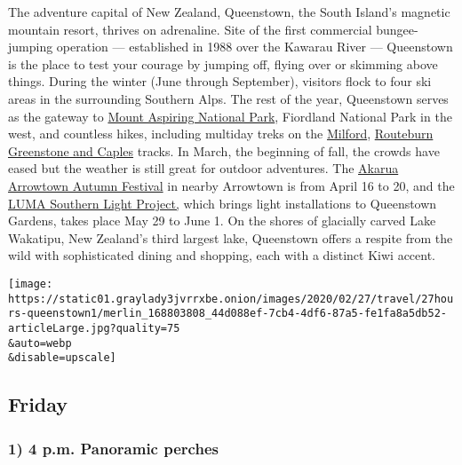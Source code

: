 The adventure capital of New Zealand, Queenstown, the South Island's
magnetic mountain resort, thrives on adrenaline. Site of the first
commercial bungee-jumping operation --- established in 1988 over the
Kawarau River --- Queenstown is the place to test your courage by
jumping off, flying over or skimming above things. During the winter
(June through September), visitors flock to four ski areas in the
surrounding Southern Alps. The rest of the year, Queenstown serves as
the gateway to
\href{https://www.doc.govt.nz/parks-and-recreation/places-to-go/otago/places/mount-aspiring-national-park/}{Mount
Aspiring National Park}, Fiordland National Park in the west, and
countless hikes, including multiday treks on the
\href{https://www.doc.govt.nz/parks-and-recreation/places-to-go/fiordland/places/fiordland-national-park/things-to-do/tracks/milford-track/}{Milford},
\href{https://www.doc.govt.nz/parks-and-recreation/places-to-go/fiordland/places/fiordland-national-park/things-to-do/tracks/routeburn-track/}{Routeburn}
\href{https://www.doc.govt.nz/parks-and-recreation/places-to-go/otago/places/greenstone-and-caples-conservation-areas/things-to-do/greenstone-and-caples-tracks/}{Greenstone
and Caples} tracks. In March, the beginning of fall, the crowds have
eased but the weather is still great for outdoor adventures. The
\href{https://arrowtownautumnfestival.co.nz/}{Akarua Arrowtown Autumn
Festival} in nearby Arrowtown is from April 16 to 20, and the
\href{http://luma.nz/}{LUMA Southern Light Project,} which brings light
installations to Queenstown Gardens, takes place May 29 to June 1. On
the shores of glacially carved Lake Wakatipu, New Zealand's third
largest lake, Queenstown offers a respite from the wild with
sophisticated dining and shopping, each with a distinct Kiwi accent.

\texttt{[image: https://static01.graylady3jvrrxbe.onion/images/2020/02/27/travel/27hours-queenstown1/merlin\_168803808\_44d088ef-7cb4-4df6-87a5-fe1fa8a5db52-articleLarge.jpg?quality=75\\\&auto=webp\\\&disable=upscale]}

\hypertarget{friday}{%
\subsection{Friday}\label{friday}}

\hypertarget{1-4-pm-panoramic-perches}{%
\subsubsection{\texorpdfstring{\textbf{1) 4 p.m. Panoramic
perches}}{1) 4 p.m. Panoramic perches}}\label{1-4-pm-panoramic-perches}}

